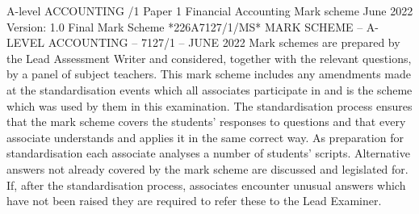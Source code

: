 \documentclass{article}
\begin{document}
     \newline
 \newline
 \newline
 \newline
 \newline
A-level \newline
 \newline
ACCOUNTING \newline
 /1 \newline
 \newline
Paper 1  Financial Accounting \newline
 \newline
Mark scheme \newline
 \newline
June 2022 \newline
 \newline
Version: 1.0 Final Mark Scheme \newline
 \newline
*226A7127/1/MS* \newline
MARK SCHEME – A-LEVEL ACCOUNTING – 7127/1 – JUNE 2022  \newline
Mark schemes are prepared by the Lead Assessment Writer and considered, together with the relevant \newline
questions, by a panel of subject teachers.  This mark scheme includes any amendments made at the \newline
standardisation events which all associates participate in and is the scheme which was used by them in \newline
this examination.  The standardisation process ensures that the mark scheme covers the students’ \newline
responses to questions and that every associate understands and applies it in the same correct way.  \newline
As preparation for standardisation each associate analyses a number of students’ scripts.  Alternative \newline
answers not already covered by the mark scheme are discussed and legislated for.  If, after the \newline
standardisation process, associates encounter unusual answers which have not been raised they are \newline
required to refer these to the Lead Examiner. \newline
 \newline
\end{document}
